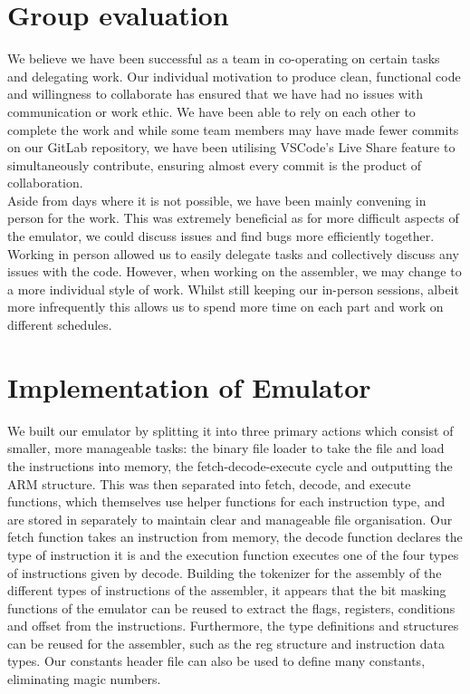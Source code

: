 \documentclass [10pt] {article}
\begin{document}
\section*{Group evaluation}
We believe we have been successful as a team in co-operating on certain tasks and delegating work. Our individual motivation to produce clean, functional code and willingness to collaborate has ensured that we have had no issues with communication or work ethic. We have been able to rely on each other to complete the work and while some team members may have made fewer commits on our GitLab repository, we have been utilising VSCode’s Live Share feature to simultaneously contribute, ensuring almost every commit is the product of collaboration. 
\vspace {0.3cm}
\\
Aside from days where it is not possible, we have been mainly convening in person for the work. This was extremely beneficial as for more difficult aspects of the emulator, we could discuss issues and find bugs more efficiently together. Working in person allowed us to easily delegate tasks and collectively discuss any issues with the code. However, when working on the assembler, we may change to a more individual style of work. Whilst still keeping our in-person sessions, albeit more infrequently this allows us to spend more time on each part and work on different schedules.

\section*{Implementation of Emulator}
We built our emulator by splitting it into three primary actions which consist of smaller, more manageable tasks: the binary file loader to take the file and load the instructions into memory, the fetch-decode-execute cycle and outputting the ARM structure. This was then separated into fetch, decode, and execute functions, which themselves use helper functions for each instruction type, and are stored in separately to maintain clear and manageable file organisation. Our fetch function takes an instruction from memory, the decode function declares the type of instruction it is and the execution function executes one of the four types of instructions given by decode. Building the tokenizer for the assembly of the different types of instructions of the assembler, it appears that the bit masking functions of the emulator can be reused to extract the flags, registers, conditions and offset from the instructions. Furthermore, the type definitions and structures can be reused for the assembler, such as the reg structure and instruction data types. Our constants header file can also be used to define many constants, eliminating magic numbers.
\end{document}
